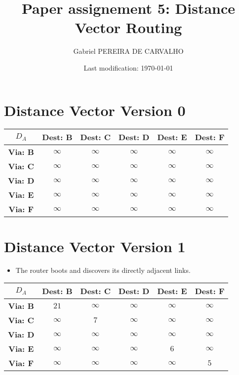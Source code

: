 \documentclass[]{article}
\title{Paper assignement 5: Distance Vector Routing}
\author{Gabriel PEREIRA DE CARVALHO}
\date{Last modification: \today}
\begin{document}
	
	\maketitle
	
	\section*{Distance Vector Version 0}
	
	\begin{center}
		\begin{tabular}{ |c|c|c|c|c|c| } 
			\hline
			\textbf{$D_A$} & \textbf{Dest: B} & \textbf{Dest: C} &  \textbf{Dest: D} & \textbf{Dest: E} & \textbf{Dest: F} \\
			\hline
			\textbf{Via: B} & $\infty$ & $\infty$ & $\infty$ & $\infty$ & $\infty$ \\
			\hline 
			\textbf{Via: C} & $\infty$ & $\infty$ & $\infty$ & $\infty$ & $\infty$ \\
			\hline
			\textbf{Via: D} & $\infty$ & $\infty$ & $\infty$ & $\infty$ & $\infty$ \\
			\hline
			\textbf{Via: E} & $\infty$ & $\infty$ & $\infty$ & $\infty$ & $\infty$ \\
			\hline
			\textbf{Via: F} & $\infty$ & $\infty$ & $\infty$ & $\infty$ & $\infty$ \\
			\hline
		\end{tabular}
	\end{center}
	
	\section*{Distance Vector Version 1}
	
	\begin{itemize}
		\item The router boots and discovers its directly adjacent links.
	\end{itemize}
		
	\begin{center}
		\begin{tabular}{ |c|c|c|c|c|c| } 
			\hline
			\textbf{$D_A$} & \textbf{Dest: B} & \textbf{Dest: C} &  \textbf{Dest: D} & \textbf{Dest: E} & \textbf{Dest: F} \\
			\hline
			\textbf{Via: B} & $21$ & $\infty$ & $\infty$ & $\infty$ & $\infty$ \\
			\hline 
			\textbf{Via: C} & $\infty$ & $7$ & $\infty$ & $\infty$ & $\infty$ \\
			\hline
			\textbf{Via: D} & $\infty$ & $\infty$ & $\infty$ & $\infty$ & $\infty$ \\
			\hline
			\textbf{Via: E} & $\infty$ & $\infty$ & $\infty$ & $6$ & $\infty$ \\
			\hline
			\textbf{Via: F} & $\infty$ & $\infty$ & $\infty$ & $\infty$ & $5$ \\
			\hline
		\end{tabular}
	\end{center}
	
\end{document}
